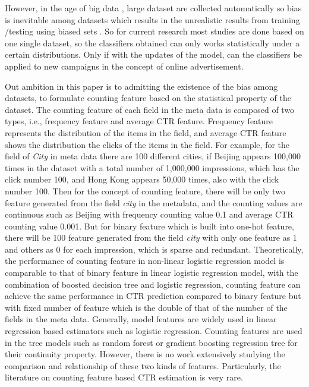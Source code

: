 \documentclass{sig-alternate}
\begin{document}
However, in the age of big data \cite{lohr2012age}, large dataset are collected automatically so bias is inevitable among datasets which results in the unrealistic results from training /testing using biased sets \cite{torralba2011unbiased}. So for current research most studies are done based on one single dataset, so the classifiers obtained can only works statistically under a certain distributions. Only if with the updates of the model, can the classifiers be applied to new campaigns in the concept of online advertisement. 

Out ambition in this paper is to admitting the existence of the bias among datasets, to formulate counting feature based on the statistical property of the dataset. The counting feature of each field in the meta data is composed of two types, i.e., frequency feature and average CTR feature. Frequency feature represents the distribution of the items in the field, and average CTR feature shows the distribution the clicks of the items in the field. For example, for the field of \textit{City} in meta data there are 100 different cities, if Beijing appears 100,000 times in the dataset with a total number of 1,000,000 impressions, which has the click number 100, and Hong Kong appears 50,000 times, also with the click number 100. Then for the concept of counting feature, there will be only two feature generated from the field \textit{city} in the metadata, and the counting values are continuous such as Beijing with frequency counting value 0.1 and average CTR counting value 0.001. But for binary feature which is built into one-hot feature, there will be 100 feature generated from the field \textit{city} with only one feature as 1 and others as 0 for each impression, which is sparse and redundant. Theoretically, the performance of counting feature in non-linear logistic regression model is comparable to that of binary feature in linear logistic regression model, with the combination of boosted decision tree and logistic regression, counting feature can achieve the same performance in CTR prediction compared to binary feature but with fixed number of feature which is the double of that of the number of the fields in the meta data. Generally, model features are widely used in linear regression based estimators such as logistic regression. Counting features are used in the tree models such as random forest or gradient boosting regression tree for their continuity property. However, there is no work extensively studying the comparison and relationship of these two kinds of features. Particularly, the literature on counting feature based CTR estimation is very rare.
\end{document}
